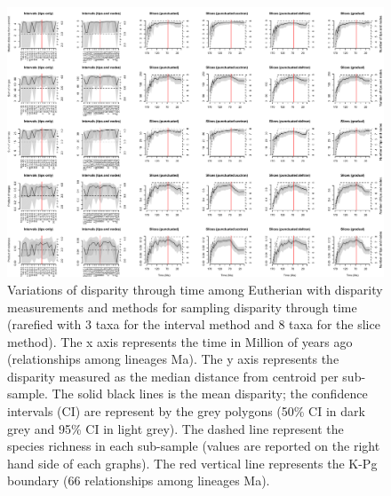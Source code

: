 \begin{landscape}
\begin{figure}[!htbp]
\centering
    \includegraphics[width=\textwidth,height=\textheight,keepaspectratio]{Supplementaries/Figures/STD/Eutheria_all_methods_rarefied.pdf}
\caption[Comparison of all the disparity metrics and all the time series methods for Eutheria (rarefied)]{Variations of disparity through time among Eutherian with disparity measurements and methods for sampling disparity through time (rarefied with 3 taxa for the interval method and 8 taxa for the slice method). The x axis represents the time in Million of years ago (relationships among lineages
Ma). The y axis represents the disparity measured as the median distance from centroid per sub-sample. The solid black lines is the mean disparity; the confidence intervals (CI) are represent by the grey polygons (50\% CI in dark grey and 95\% CI in light grey). The dashed line represent the species richness in each sub-sample (values are reported on the right hand side of each graphs). The red vertical line represents the K-Pg boundary (66 relationships among lineages
Ma).}
\label{Supp_disparity_all_Eutheria_rarefied}

\end{figure}
\end{landscape}